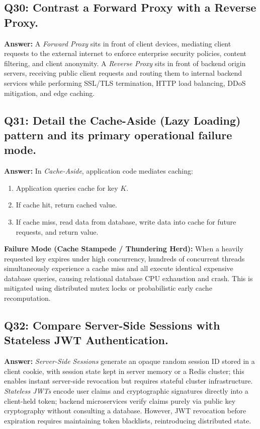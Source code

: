 \subsection*{Q30: Contrast a Forward Proxy with a Reverse Proxy.}
\textbf{Answer:} A \textit{Forward Proxy} sits in front of client devices, mediating client requests to the external internet to enforce enterprise security policies, content filtering, and client anonymity. A \textit{Reverse Proxy} sits in front of backend origin servers, receiving public client requests and routing them to internal backend services while performing SSL/TLS termination, HTTP load balancing, DDoS mitigation, and edge caching.

\subsection*{Q31: Detail the Cache-Aside (Lazy Loading) pattern and its primary operational failure mode.}
\textbf{Answer:} In \textit{Cache-Aside}, application code mediates caching:
\begin{enumerate}[label=\arabic*.]
    \item Application queries cache for key $K$.
    \item If cache hit, return cached value.
    \item If cache miss, read data from database, write data into cache for future requests, and return value.
\end{enumerate}
\textbf{Failure Mode (Cache Stampede / Thundering Herd):} When a heavily requested key expires under high concurrency, hundreds of concurrent threads simultaneously experience a cache miss and all execute identical expensive database queries, causing relational database CPU exhaustion and crash. This is mitigated using distributed mutex locks or probabilistic early cache recomputation.

\subsection*{Q32: Compare Server-Side Sessions with Stateless JWT Authentication.}
\textbf{Answer:} \textit{Server-Side Sessions} generate an opaque random session ID stored in a client cookie, with session state kept in server memory or a Redis cluster; this enables instant server-side revocation but requires stateful cluster infrastructure. \textit{Stateless JWTs} encode user claims and cryptographic signatures directly into a client-held token; backend microservices verify claims purely via public key cryptography without consulting a database. However, JWT revocation before expiration requires maintaining token blacklists, reintroducing distributed state.

